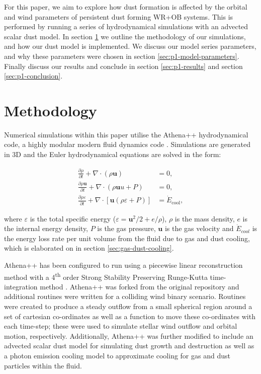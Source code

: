 \documentclass[fleqn,usenatbib]{mnras}
\newcommand{\ts}{\textsuperscript}
\begin{document}
For this paper, we aim to explore how dust formation is affected by the orbital and wind parameters of persistent dust forming WR+OB systems.
This is performed by running a series of hydrodynamical simulations with an advected scalar dust model.
In section \ref{sec:methodology} we outline the methodology of our simulations, and how our dust model is implemented. 
We discuss our model series parameters, and why these parameters were chosen in section \ref{sec:p1-model-parameters}.
Finally discuss our results and conclude in section \ref{sec:p1-results} and section \ref{sec:p1-conclusion}.

\section{Methodology}
\label{sec:methodology}

Numerical simulations within this paper utilise the Athena++ hydrodynamical code, a highly modular modern fluid dynamics code \citep{stoneAthenaAdaptiveMesh2020}.
Simulations are generated in 3D and the Euler hydrodynamical equations are solved in the form:

\begin{subequations}
  \begin{align}
    \frac{\partial\rho}{\partial t}+\nabla \cdot \left(\rho \boldsymbol{u}\right) & = 0 , \\
    \frac{\partial \rho \boldsymbol{u}}{\partial t} + \nabla \cdot \left(\rho \boldsymbol{u} u + P \right) & = 0, \\
    \frac{\partial \rho \varepsilon}{\partial t} + \nabla \cdot \left[ \boldsymbol{u} \left( \rho\varepsilon + P \right) \right] & = \dot E_\text{cool} , 
  \end{align}
\end{subequations}

\noindent
where $\varepsilon$ is the total specific energy ($\varepsilon = \boldsymbol{u}^2/2 + e/\rho $), $\rho$ is the mass density, $e$ is the internal energy density, $P$ is the gas pressure, $\boldsymbol{u}$ is the gas velocity and $\dot E_{cool}$ is the energy loss rate per unit volume from the fluid due to gas and dust cooling, which is elaborated on in section \ref{sec:gas-dust-cooling}.


Athena++ has been configured to run using a piecewise linear reconstruction method with a 4\ts{th} order Strong Stability Preserving Runge-Kutta time-integration method \citep{spiteriNewClassOptimal2002}.
Athena++ was forked from the original repository and additional routines were written for a colliding wind binary scenario.
Routines were created to produce a steady outflow from a small spherical region around a set of cartesian co-ordinates as well as a function to move these co-ordinates with each time-step; these were used to simulate stellar wind outflow and orbital motion, respectively.
Additionally, Athena++ was further modified to include an advected scalar dust model for simulating dust growth and destruction as well as a photon emission cooling model to approximate cooling for gas and dust particles within the fluid.
\end{document}

